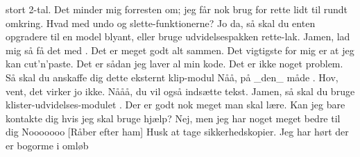 \documentclass[a4paper,11pt]{article}
\begin{document}
\begin{sketch}
stort 2-tal.
       Det minder mig forresten om; jeg får nok brug for rette lidt til
rundt omkring. Hvad med         undo og slette-funktionerne?
      Jo da, så skal du enten opgradere til en model blyant, eller
bruge udvidelsespakken rette-lak.
      Jamen, lad mig så få det med .
      Det er meget godt alt sammen. Det vigtigste for mig er at jeg
kan cut'n'paste. Det er sådan jeg laver al min kode.
      Det er ikke noget problem. Så skal du anskaffe dig dette
eksternt klip-modul 
      Nåå, på \_den\_ måde . Hov, vent, det virker jo ikke.
      Nååå, du vil også indsætte tekst. Jamen, så skal du bruge
klister-udvidelses-modulet .
      Der er godt nok meget man skal lære. Kan jeg bare kontakte dig
hvis jeg skal bruge hjælp?
      Nej, men jeg har noget meget bedre til dig 
      Nooooooo
[Råber efter ham] Husk at tage sikkerhedskopier. Jeg har hørt der
er bogorme i omløb

\end{sketch}
\end{document}
